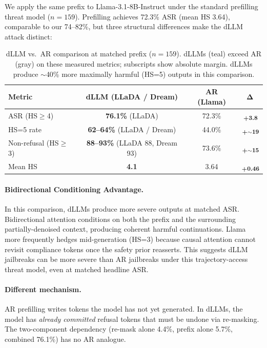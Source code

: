 \documentclass{article}
\newcommand{\dup}[1]{\,\textsubscript{\textcolor{deltaup}{\textbf{+#1}}}}
\theoremstyle{coloredthm}
\newcommand{\dllm}{dLLM}
\newcommand{\dllms}{dLLMs}
\begin{document}
We apply the same prefix to Llama-3.1-8B-Instruct \citep{meta2024llama3} under the standard prefilling threat model ($n{=}159$). Prefilling achieves 72.3\% ASR (mean HS 3.64), comparable to our 74--82\%, but three structural differences make the \dllm{} attack distinct:

\begin{table}[H]
\centering
\small
\setlength{\tabcolsep}{5pt}
\renewcommand{\arraystretch}{1.1}
\begin{tabular}{@{}lccc@{}}
\toprule
\textbf{Metric} & \textbf{dLLM (LLaDA / Dream)} & \textbf{AR (Llama)} & $\boldsymbol{\Delta}$ \\
\midrule
ASR (HS$\geq$4) & \cellcolor{celltealg}\textbf{76.1\%} (LLaDA) & \cellcolor{cellgray}72.3\% & \dup{3.8} \\
HS=5 rate & \cellcolor{celltealg}\textbf{62--64\%} (LLaDA / Dream) & \cellcolor{cellgray}44.0\% & \dup{$\sim$19} \\
Non-refusal (HS$\geq$3) & \cellcolor{celltealg}\textbf{88--93\%} (LLaDA 88, Dream 93) & \cellcolor{cellgray}73.6\% & \dup{$\sim$15} \\
Mean HS & \cellcolor{celltealg}\textbf{4.1} & \cellcolor{cellgray}3.64 & \dup{0.46} \\
\bottomrule
\end{tabular}
\caption{dLLM vs.\ AR comparison at matched prefix ($n{=}159$). dLLMs (teal) exceed AR (gray) on these measured metrics; subscripts show absolute margin. dLLMs produce $\sim$40\% more maximally harmful (HS=5) outputs in this comparison.}
\label{tab:ar_comparison}
\end{table}

\paragraph{Bidirectional Conditioning Advantage.} In this comparison, dLLMs produce more severe outputs at matched ASR. Bidirectional attention conditions on both the prefix and the surrounding partially-denoised context, producing coherent harmful continuations. Llama more frequently hedges mid-generation (HS=3) because causal attention cannot revisit compliance tokens once the safety prior reasserts. This suggests dLLM jailbreaks can be more severe than AR jailbreaks under this trajectory-access threat model, even at matched headline ASR.

\paragraph{Different mechanism.} AR prefilling writes tokens the model has not yet generated. In \dllms{}, the model has \textit{already committed} refusal tokens that must be undone via re-masking. The two-component dependency (re-mask alone 4.4\%, prefix alone 5.7\%, combined 76.1\%) has no AR analogue.
\end{document}
